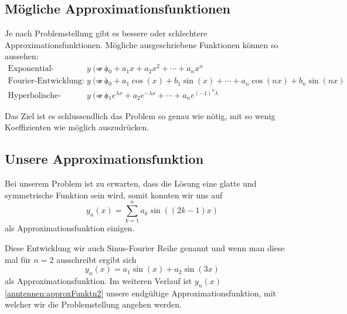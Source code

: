 \subsection{Mögliche Approximationsfunktionen\label{antennen:approxBsp}}

Je nach Problemstellung gibt es bessere oder schlechtere Approximationsfunktionen.
Mögliche ausgeschriebene Funktionen können so aussehen:
\begin{equation}
	\begin{aligned}
		\text{Exponential-Entwicklung: }
		y(x)
		&=
		a_0+a_1 x+a_2 x^2+\cdots+a_n x^n \\
		\text{Fourier-Entwicklung: } 
		y(x)
		&=
		a_0+a_1\cos(x)+b_1\sin(x)+\cdots+a_n\cos(n x)+b_n\sin(n x)\\
		\text{Hyperbolische-Entwicklung: } 
		y(x)
		&=
		a_1 e^{\lambda x}+a_2 e^{-\lambda x}+\cdots+a_n e^{(-1)^n \lambda}
	\end{aligned}
\label{antennen:approxFunktBsp}
\end{equation}

Das Ziel ist es schlussendlich das Problem so genau wie nötig, mit so wenig
Koeffizienten wie möglich auszudrücken.


\subsection{Unsere Approximationsfunktion\label{antennen:unsereApproxFunkt}}

Bei unserem Problem ist zu erwarten, dass die Lösung eine glatte und symmetrische
Funktion sein wird, somit konnten wir uns auf
\begin{equation}
y_n(x)
= 
\sum_{k=1}^n a_k\sin((2k-1)x)
\label{antennen:unserRitz}
\end{equation}
als Approximationsfunktion einigen. 

Diese Entwicklung wir auch Sinus-Fourier Reihe genannt
und wenn man diese mal für $n=2$ ausschreibt ergibt sich
\begin{equation}
y_n(x)
=
a_1\sin(x)+a_2\sin(3x)
\label{anntennen:approxFunktn2}
\end{equation}
als Approximationsfunktion. Im weiteren Verlauf ist $y_n(x)$ \eqref{anntennen:approxFunktn2} 
unsere endgültige Approximationsfunktion, mit welcher wir die Problemstellung angehen werden.





